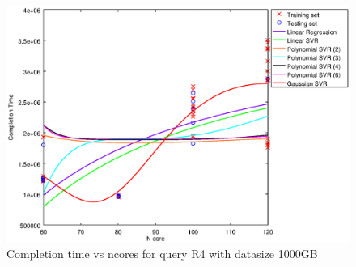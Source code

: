 
\begin {figure}[hbtp]
\centering
\includegraphics[width=\textwidth]{output/R4_1000_ONLY_1_OVER_NCORES/plot_R4_1000.eps}
\caption{Completion time vs ncores for query R4 with datasize 1000GB}
\label{fig:all_nonlinear_R4_1000}
\end {figure}
